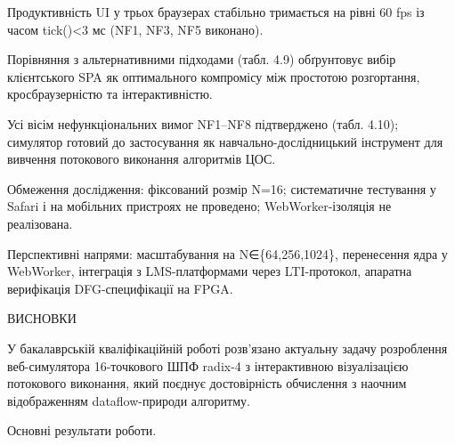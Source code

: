 \documentclass[
]{article}
\begin{document}
Продуктивність UI у трьох браузерах стабільно тримається на рівні 60 fps
із часом tick()\textless3 мс (NF1, NF3, NF5 виконано).

Порівняння з альтернативними підходами (табл. 4.9) обґрунтовує вибір
клієнтського SPA як оптимального компромісу між простотою розгортання,
кросбраузерністю та інтерактивністю.

Усі вісім нефункціональних вимог NF1--NF8 підтверджено (табл. 4.10);
симулятор готовий до застосування як навчально-дослідницький інструмент
для вивчення потокового виконання алгоритмів ЦОС.

Обмеження дослідження: фіксований розмір N=16; систематичне тестування у
Safari і на мобільних пристроях не проведено; WebWorker-ізоляція не
реалізована.

Перспективні напрями: масштабування на N∈\{64,256,1024\}, перенесення
ядра у WebWorker, інтеграція з LMS-платформами через LTI-протокол,
апаратна верифікація DFG-специфікації на FPGA.

ВИСНОВКИ

У бакалаврській кваліфікаційній роботі розв'язано актуальну задачу
розроблення веб-симулятора 16-точкового ШПФ radix-4 з інтерактивною
візуалізацією потокового виконання, який поєднує достовірність
обчислення з наочним відображенням dataflow-природи алгоритму.

Основні результати роботи.
\end{document}
